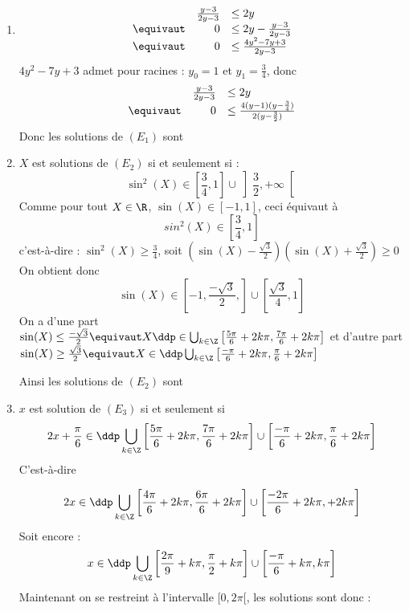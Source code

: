 \documentclass[a4paper, 11pt,reqno]{article}
\begin{document}
\begin{correction}
\begin{enumerate}
\item 
$$\begin{array}{lrl}
&\frac{y-3}{2y-3}&\leq 2y\\
\equivaut &0 &\leq 2y - \frac{y-3}{2y-3}\\
\equivaut &0 &\leq \frac{4y^2-7y+3}{2y-3}
\end{array}$$
$4y^2-7y+3$ admet pour racines : $y_0 = 1$ et $y_1 =\frac{3}{4}$, donc 
$$\begin{array}{lrl}
&\frac{y-3}{2y-3}&\leq 2y\\
\equivaut &0&\leq \frac{4(y-1)(y-\frac{3}{4})}{2(y-\frac{3}{2})}
\end{array}$$
Donc les solutions de $(E_1)$ sont 
\conclusion{ $\cS_1 = \left[ \frac{3}{4}, 1\right] \cup \left] \frac{3}{2}, +\infty\right[ $} 


\item $X$ est solutions de $(E_2)$ si et seulement si : 
$$\sin^2(X) \in \left[ \frac{3}{4}, 1\right] \cup \left] \frac{3}{2}, +\infty\right[ $$
Comme pour tout $X\in \R$,  $\sin(X) \in [-1,1]$, ceci équivaut à 
$$sin^2(X) \in \left[ \frac{3}{4}, 1\right] $$
c'est-à-dire : $\sin^2(X) \geq \frac{3}{4}$, soit 
$\left(\sin(X) -\frac{\sqrt{3}}{2}\right)\left(\sin(X) +\frac{\sqrt{3}}{2}\right)\geq 0$ 
On obtient donc 
$$\sin(X) \in  \left[ -1, \frac{-\sqrt{3}}{2},\right] \cup  \left[ \frac{\sqrt3}{4}, 1\right] $$
On a  d'une part $\sin(X) \leq  \frac{-\sqrt{3}}{2} \equivaut X \ddp \in \bigcup_{k\in \Z} \left[ \frac{5\pi}{6} +2k\pi,\frac{7\pi}{6} +2k\pi \right] $
et d'autre part 
$\sin(X) \geq  \frac{\sqrt{3}}{2} \equivaut X \in \ddp \bigcup_{k\in \Z} \left[ \frac{-\pi}{6} +2k\pi,\frac{\pi}{6} +2k\pi \right] $

Ainsi les solutions de $(E_2)$ sont


\item $x$ est solution de $(E_3)$ si et seulement si 
$$2x+\frac{\pi}{6}\in \ddp   \bigcup_{k\in \Z} \left[ \frac{5\pi}{6} +2k\pi,\frac{7\pi}{6} +2k\pi \right]  \cup \left[ \frac{-\pi}{6} +2k\pi,\frac{\pi}{6} +2k\pi \right]$$ 
C'est-à-dire 

$$2x\in \ddp   \bigcup_{k\in \Z} \left[ \frac{4\pi}{6} +2k\pi,\frac{6\pi}{6} +2k\pi \right]  \cup \left[ \frac{-2\pi}{6} +2k\pi, +2k\pi \right]$$ 
Soit encore : 
$$x\in \ddp   \bigcup_{k\in \Z} \left[ \frac{2\pi}{9} +k\pi,\frac{\pi}{2} +k\pi \right]  \cup \left[ \frac{-\pi}{6} +k\pi, k\pi \right]$$
Maintenant on se restreint à l'intervalle $[0,2\pi[$, les solutions sont donc :
\conclusion{ $\cS_3= \left[ \frac{2\pi}{9} ,\frac{\pi}{2} \right]\cup \left[ \frac{11\pi}{9} ,\frac{3\pi}{2}  \right]   \cup\left\{0\right\} \cup \left[ \frac{5\pi}{6}, \pi \right]\cup \left[ \frac{11\pi}{6} , 2\pi \right[      $}


\end{enumerate}



\end{correction}
\end{document}
